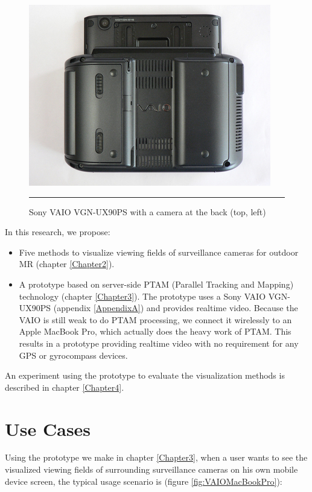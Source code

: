 \begin{figure}[htbp]
	\centering
	\includegraphics{./Primitives/vaio_back.jpg}
	\rule{35em}{0.5pt}
	\caption[Sony VAIO VGN-UX90PS with a camera at the back]{Sony VAIO VGN-UX90PS with a camera at the back (top, left)}
	\label{fig:VAIOBack}
\end{figure}

In this research, we propose:

\begin{itemize}
	\item Five methods to visualize viewing fields of surveillance cameras for outdoor MR (chapter \ref{Chapter2}).
	\item A prototype based on server-side PTAM (Parallel Tracking and Mapping) \citep{Reference12} technology (chapter \ref{Chapter3}). The prototype uses a Sony VAIO VGN-UX90PS (appendix \ref{AppendixA}) and provides realtime video. Because the VAIO is still weak to do PTAM processing, we connect it wirelessly to an Apple MacBook Pro, which actually does the heavy work of PTAM. This results in a prototype providing realtime video with no requirement for any GPS or gyrocompass devices.
\end{itemize}

An experiment using the prototype to evaluate the visualization methods is described in chapter \ref{Chapter4}.


\section{Use Cases}
\label{UseCases}

Using the prototype we make in chapter \ref{Chapter3}, when a user wants to see the visualized viewing fields of surrounding surveillance cameras on his own mobile device screen, the typical usage scenario is (figure \ref{fig:VAIOMacBookPro}):

